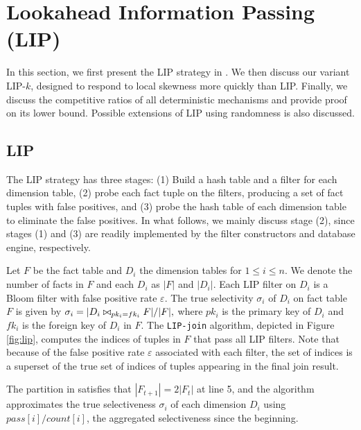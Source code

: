 
\section{Lookahead Information Passing (LIP)}
In this section, we first present the LIP strategy in \cite{zhu2017looking}. We then discuss our variant LIP-$k$, designed to respond to local skewness more quickly than LIP. Finally, we discuss the competitive ratios of all deterministic mechanisms and provide proof on its lower bound. Possible extensions of LIP using randomness is also discussed.

\subsection{LIP}
The LIP strategy has three stages: (1) Build a hash table and a filter for each dimension table, (2) probe each fact tuple on the filters, producing a set of fact tuples with false positives, and (3) probe the hash table of each dimension table to eliminate the false positives. In what follows, we mainly discuss stage (2), since stages (1) and (3) are readily implemented by the filter constructors and database engine, respectively.

Let $F$ be the fact table and $D_i$ the dimension tables for $1 \leq i \leq n$. We denote the number of facts in $F$ and each $D_i$ as $|F|$ and $|D_i|$. Each LIP filter on $D_i$ is a Bloom filter with false positive rate $\varepsilon$. The true selectivity $\sigma_i$ of $D_i$ on fact table $F$ is given by $\sigma_i = |D_i \bowtie_{pk_i = fk_i} F| / |F|,$ where $pk_i$ is the primary key of $D_i$ and $fk_i$ is the foreign key of $D_i$ in $F$. The \texttt{LIP-join} algorithm, depicted in Figure \ref{fig:lip}, computes the indices of tuples in $F$ that pass all LIP filters. Note that because of the false positive rate $\varepsilon$ associated with each filter, the set of indices is a superset of the true set of indices of tuples appearing in the final join result.

The partition in \cite{zhu2017looking} satisfies that $|F_{t+1}| = 2|F_{t}|$ at line 5, and the algorithm approximates the true selectiveness $\sigma_i$ of each dimension $D_i$ using $pass[i]/count[i]$, the aggregated selectiveness since the beginning.

